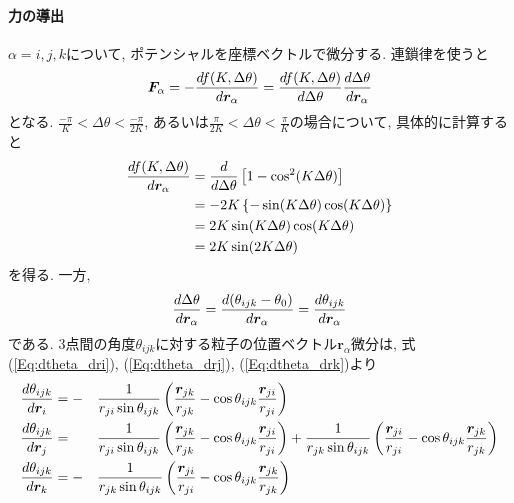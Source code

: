 \paragraph{力の導出}
$\alpha = i, j, k$について, ポテンシャルを座標ベクトルで微分する. 連鎖律を使うと
\begin{align}
   \bm{F}_{\alpha}
   =
   -
   \frac{d f(K, \Delta \theta)}{d \bm{r}_{\alpha}}
   =
   \frac{d f(K, \Delta \theta)}{d \Delta \theta}
   \frac{d \Delta \theta}{d \bm{r}_{\alpha}}
   \notag
\end{align}
となる. $\frac{-\pi}{K} < \Delta \theta < \frac{-\pi}{2K}$, あるいは$\frac{\pi}{2K} < \Delta \theta < \frac{\pi}{K}$の場合について, 具体的に計算すると
\begin{align}
   \frac{d f(K, \Delta \theta)}{d \bm{r}_{\alpha}}
   &=
   \frac{d}{d \Delta \theta}
   \left[
      1 - \cos^{2} (K \Delta \theta)
   \right]
   \notag \\
   &=
   - 2K \left\{-\sin(K \Delta \theta) \cos(K \Delta \theta)\right\}
   \notag \\
   &=
   2K \sin(K \Delta \theta) \cos(K \Delta \theta)
   \notag \\
   &=
   2K \sin (2K \Delta \theta)
   \notag
\end{align}
を得る.
一方,
\begin{align}
   \frac{d \Delta \theta}{d \bm{r}_{\alpha}}
   =
   \frac{d (\theta_{ijk} - \theta_{0})}{d \bm{r}_{\alpha}}
   =
   \frac{d \theta_{ijk}}{d \bm{r}_{\alpha}}
   \notag
\end{align}
である. 3点間の角度$\theta_{ijk}$に対する粒子の位置ベクトル$\bm{r}_{\alpha}$微分は, 式(\ref{Eq:dtheta_dri}), (\ref{Eq:dtheta_drj}), (\ref{Eq:dtheta_drk})より
\begin{alignat}{3}
   \frac{d \theta_{ijk}}{d \bm{r}_{i}}
   &=
   -&&
   \frac{1}{r_{ji} \sin\theta_{ijk}}
   \left(
            \frac{\bm{r}_{jk}}{r_{jk}}
          - \cos\theta_{ijk} \frac{\bm{r}_{ji}}{r_{ji}}
   \right)
   \notag
   \\
   \frac{d \theta_{ijk}}{d \bm{r}_{j}}
   &=&&
   \frac{1}{r_{ji} \sin\theta_{ijk}}
   \left(
            \frac{\bm{r}_{jk}}{r_{jk}}
          - \cos\theta_{ijk} \frac{\bm{r}_{ji}}{r_{ji}}
   \right)
   +
   \frac{1}{r_{jk} \sin\theta_{ijk}}
   \left(
            \frac{\bm{r}_{ji}}{r_{ji}}
          - \cos\theta_{ijk} \frac{\bm{r}_{jk}}{r_{jk}}
   \right)
   \notag
   \\
   \frac{d \theta_{ijk}}{d \bm{r}_{k}}
   &=
   -&&
   \frac{1}{r_{jk} \sin\theta_{ijk}}
   \left(
           \frac{\bm{r}_{ji}}{r_{ji}}
         - \cos\theta_{ijk} \frac{\bm{r}_{jk}}{r_{jk}}
   \right)
   \notag
\end{alignat}
